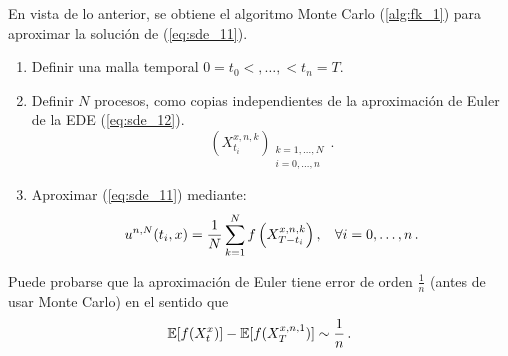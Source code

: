 En vista de lo anterior, se obtiene el algoritmo Monte Carlo (\ref{alg:fk_1}) para aproximar la 
solución de (\ref{eq:sde_11}). 
\begin{algorithm}
\label{alg:fk_1}
\begin{leftbar}
\begin{enumerate}
    \item   Definir una malla temporal $0 = t_0 <,\ldots, < t_n = T$. 
    \item Definir $N$ procesos, como copias independientes de la aproximación de Euler de la EDE (\ref{eq:sde_12}). 
    \begin{equation*}
        \left( X_{t_i}^{x,n,k} \right)_{\substack{ k = 1,\ldots, N \\  i = 0 , \ldots, n}} \,.
    \end{equation*}
    \item Aproximar (\ref{eq:sde_11}) mediante: 
        \begin{equation*}
            u^{n,N}(t_i,x) = \frac{1}{N} \sum_{k=1}^{N} f\left( X_{T-t_i}^{x,n,k} \right), \hspace{.25cm}\, \forall i = 0, \ldots, n \,.
        \end{equation*}
\end{enumerate}
\end{leftbar}
\end{algorithm}

\begin{remark}
 Puede probarse que la aproximación de Euler tiene error de orden $\frac{1}{n}$ (antes de usar Monte Carlo) en el sentido que 
 \begin{equation*}
    \mathbb{E} [f(X_t^{x})] - \mathbb{E}[f ( X_T^{x,n,1})] \sim \frac{1}{n} \,.
 \end{equation*}
\end{remark}
